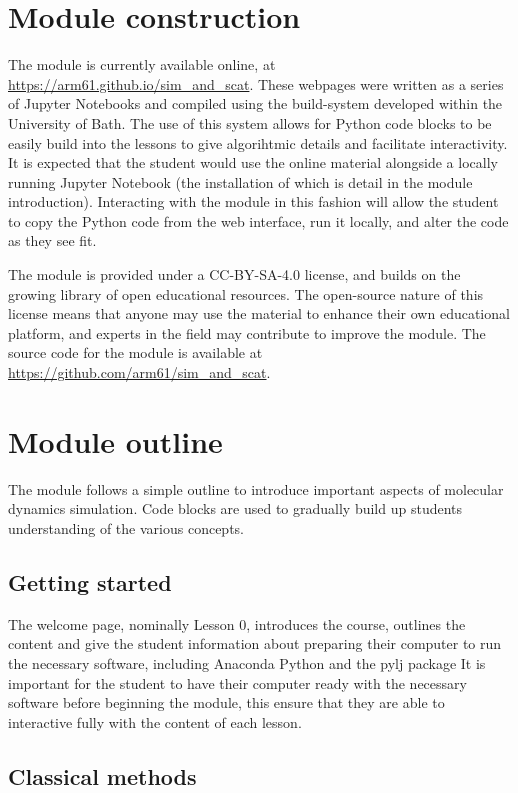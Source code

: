 \documentclass[amsmath,amssymb,twocolumn,superscriptaddress]{revtex4-1}
\begin{document}
\section{Module construction}

The module is currently available online, at \url{https://arm61.github.io/sim_and_scat}.
These webpages were written as a series of Jupyter Notebooks and compiled using the build-system developed within the University of Bath.
The use of this system allows for Python code blocks to be easily build into the lessons to give algorihtmic details and facilitate interactivity.
It is expected that the student would use the online material alongside a locally running Jupyter Notebook (the installation of which is detail in the module introduction).
Interacting with the module in this fashion will allow the student to copy the Python code from the web interface, run it locally, and alter the code as they see fit.

The module is provided under a CC-BY-SA-4.0 license, and builds on the growing library of open educational resources.
The open-source nature of this license means that anyone may use the material to enhance their own educational platform, and experts in the field may contribute to improve the module.
The source code for the module is available at \url{https://github.com/arm61/sim_and_scat}.

\section{Module outline}

The module follows a simple outline to introduce important aspects of molecular dynamics simulation.
Code blocks are used to gradually build up students understanding of the various concepts.

\subsection{Getting started}

The welcome page, nominally Lesson 0, introduces the course, outlines the content and give the student information about preparing their computer to run the necessary software, including Anaconda Python and the pylj package \cite{McCluskey2018}
It is important for the student to have their computer ready with the necessary software before beginning the module, this ensure that they are able to interactive fully with the content of each lesson.

\subsection{Classical methods}
\end{document}
